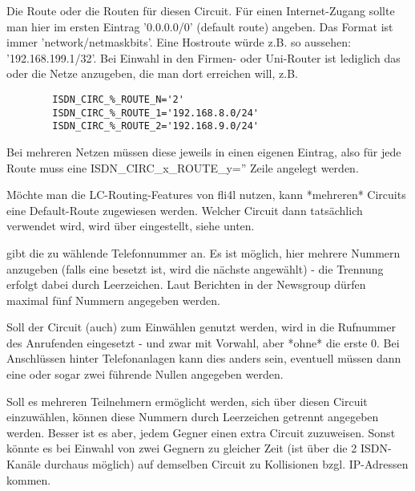\begin{description}
  
  Die Route oder die Routen für diesen Circuit. Für einen
  Internet-Zugang sollte man hier im ersten Eintrag '0.0.0.0/0' (default
  route) angeben. Das Format ist immer 'network/netmaskbits'. Eine
  Hostroute würde z.B. so aussehen: '192.168.199.1/32'. Bei Einwahl in
  den Firmen- oder Uni-Router ist lediglich das oder die Netze
  anzugeben, die man dort erreichen will, z.B.

\begin{example}
\begin{verbatim}
        ISDN_CIRC_%_ROUTE_N='2'
        ISDN_CIRC_%_ROUTE_1='192.168.8.0/24'
        ISDN_CIRC_%_ROUTE_2='192.168.9.0/24'
\end{verbatim}
\end{example}
  
  Bei mehreren  Netzen müssen diese jeweils in  einen eigenen Eintrag,
  also  für  jede  Route  muss eine  ISDN\_CIRC\_x\_ROUTE\_y=''  Zeile
  angelegt werden.
  
  Möchte man die LC-Routing-Features von fli4l nutzen, kann *mehreren*
  Circuits eine Default-Route zugewiesen werden. Welcher Circuit dann
  tatsächlich verwendet wird, wird über 
  eingestellt, siehe unten.


   gibt die zu wählende Telefonnummer an. Es ist
  möglich, hier mehrere Nummern anzugeben (falls eine besetzt ist, wird
  die nächste angewählt) - die Trennung erfolgt dabei durch Leerzeichen.
  Laut Berichten in der Newsgroup dürfen maximal fünf Nummern angegeben
  werden.


  Soll der Circuit (auch) zum Einwählen genutzt werden, wird in
   die Rufnummer des Anrufenden eingesetzt - und
  zwar mit Vorwahl, aber *ohne* die erste 0. Bei Anschlüssen hinter
  Telefonanlagen kann dies anders sein, eventuell müssen dann eine
  oder sogar zwei führende Nullen angegeben werden.
  
  Soll es mehreren Teilnehmern ermöglicht werden, sich über diesen
  Circuit einzuwählen, können diese Nummern durch Leerzeichen getrennt
  angegeben werden. Besser ist es aber, jedem Gegner einen extra
  Circuit zuzuweisen. Sonst könnte es bei Einwahl von zwei Gegnern zu
  gleicher Zeit (ist über die 2 ISDN-Kanäle durchaus möglich) auf
  demselben Circuit zu Kollisionen bzgl. IP-Adressen kommen.
  

\end{description}
